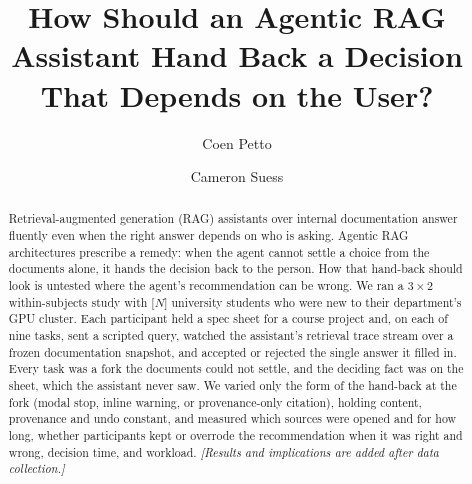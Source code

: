\documentclass[manuscript,review]{acmart}
\newcommand{\todo}[1]{{\itshape\color{black!60}[#1]}}
\begin{document}
\title{How Should an Agentic RAG Assistant Hand Back a Decision That Depends on the User?}

\author{Coen Petto}
\author{Cameron Suess}

\renewcommand{\shortauthors}{Petto and Suess}

\begin{abstract}
Retrieval-augmented generation (RAG) assistants over internal documentation
answer fluently even when the right answer depends on who is asking. Agentic
RAG architectures prescribe a remedy: when the agent cannot settle a choice
from the documents alone, it hands the decision back to the person. How that
hand-back should look is untested where the agent's recommendation can be
wrong. We ran a $3\times2$ within-subjects study with [$N$] university
students who were new to their department's GPU cluster. Each participant
held a spec sheet for a course project and, on each of nine tasks, sent a
scripted query, watched the assistant's retrieval trace stream over a frozen
documentation snapshot, and accepted or rejected the single answer it filled
in. Every task was a fork the documents could not settle, and the deciding
fact was on the sheet, which the assistant never saw. We varied only the
form of the hand-back at the fork (modal stop, inline warning, or
provenance-only citation), holding content, provenance and undo constant,
and measured which sources were opened and for how long, whether
participants kept or overrode the recommendation when it was right and
wrong, decision time, and workload. \todo{Results and implications are
added after data collection.}
\end{abstract}


\maketitle

\end{document}

